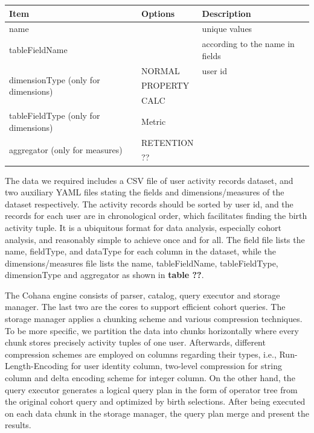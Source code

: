 \documentclass[10pt,conference,letterpaper]{IEEEtran}
\begin{document}
\begin{center}
\begin{tabular}{ | p{8em} | p{5em} | p{8em} | }
\hline
Item & Options & Description \\
\hline
name & & unique values \\
\hline
tableFieldName & & according to the name in fields \\
\hline
\multirow{3}{*}{dimensionType (only for dimensions)} & NORMAL & user id \\\cline{2-3}
& PROPERTY &  \\\cline{2-3}
& CALC & \\
\hline
tableFieldType (only for dimensions) & Metric & \\
\hline
\multirow{2}{*}{aggregator (only for measures)} & RETENTION & \\\cline{2-3}
& ?? & \\
\hline
\end{tabular}
\end{center}

The data we required includes a CSV file of user activity records dataset, and two auxiliary YAML files stating the fields and dimensions/measures of the dataset respectively. The activity records should be sorted by user id, and the records for each user are in chronological order, which facilitates finding the birth activity tuple. It is a ubiquitous format for data analysis, especially cohort analysis, and reasonably simple to achieve once and for all. The field file lists the name, fieldType, and dataType for each column in the dataset, while the dimensions/measures file lists the name,  tableFieldName, tableFieldType, dimensionType and aggregator as shown in \textbf{table ??}.

The Cohana engine consists of parser, catalog, query executor and storage manager. The last two are the cores to support efficient cohort queries. The storage manager applies a chunking scheme and various compression techniques. To be more specific, we partition the data into chunks horizontally where every chunk stores precisely activity tuples of one user. Afterwards, different compression schemes are employed on columns regarding their types, i.e., Run-Length-Encoding for user identity column, two-level compression for string column and delta encoding scheme for integer column. On the other hand, the query executor generates a logical query plan in the form of operator tree from the original cohort query and optimized by birth selections. After being executed on each data chunk in the storage manager, the query plan merge and present the results.
\end{document}
